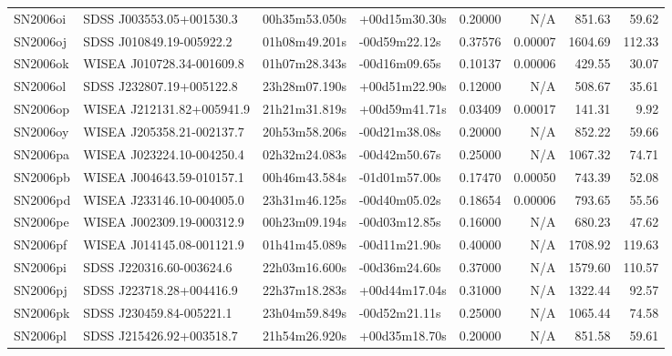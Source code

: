 \begin{longtable}{llllrrrr}
SN2006oi         &        SDSS J003553.05+001530.3 &   00h35m53.050s &   +00d15m30.30s &  0.20000 &      N/A &   851.63 &       59.62 \\
SN2006oj         &        SDSS J010849.19-005922.2 &   01h08m49.201s &   -00d59m22.12s &  0.37576 &  0.00007 &  1604.69 &      112.33 \\
SN2006ok         &       WISEA J010728.34-001609.8 &   01h07m28.343s &   -00d16m09.65s &  0.10137 &  0.00006 &   429.55 &       30.07 \\
SN2006ol         &        SDSS J232807.19+005122.8 &   23h28m07.190s &   +00d51m22.90s &  0.12000 &      N/A &   508.67 &       35.61 \\
SN2006op         &       WISEA J212131.82+005941.9 &   21h21m31.819s &   +00d59m41.71s &  0.03409 &  0.00017 &   141.31 &        9.92 \\
SN2006oy         &       WISEA J205358.21-002137.7 &   20h53m58.206s &   -00d21m38.08s &  0.20000 &      N/A &   852.22 &       59.66 \\
SN2006pa         &       WISEA J023224.10-004250.4 &   02h32m24.083s &   -00d42m50.67s &  0.25000 &      N/A &  1067.32 &       74.71 \\
SN2006pb         &       WISEA J004643.59-010157.1 &   00h46m43.584s &   -01d01m57.00s &  0.17470 &  0.00050 &   743.39 &       52.08 \\
SN2006pd         &       WISEA J233146.10-004005.0 &   23h31m46.125s &   -00d40m05.02s &  0.18654 &  0.00006 &   793.65 &       55.56 \\
SN2006pe         &       WISEA J002309.19-000312.9 &   00h23m09.194s &   -00d03m12.85s &  0.16000 &      N/A &   680.23 &       47.62 \\
SN2006pf         &       WISEA J014145.08-001121.9 &   01h41m45.089s &   -00d11m21.90s &  0.40000 &      N/A &  1708.92 &      119.63 \\
SN2006pi         &        SDSS J220316.60-003624.6 &   22h03m16.600s &   -00d36m24.60s &  0.37000 &      N/A &  1579.60 &      110.57 \\
SN2006pj         &        SDSS J223718.28+004416.9 &   22h37m18.283s &   +00d44m17.04s &  0.31000 &      N/A &  1322.44 &       92.57 \\
SN2006pk         &        SDSS J230459.84-005221.1 &   23h04m59.849s &   -00d52m21.11s &  0.25000 &      N/A &  1065.44 &       74.58 \\
SN2006pl         &        SDSS J215426.92+003518.7 &   21h54m26.920s &   +00d35m18.70s &  0.20000 &      N/A &   851.58 &       59.61 \\

\end{longtable}
